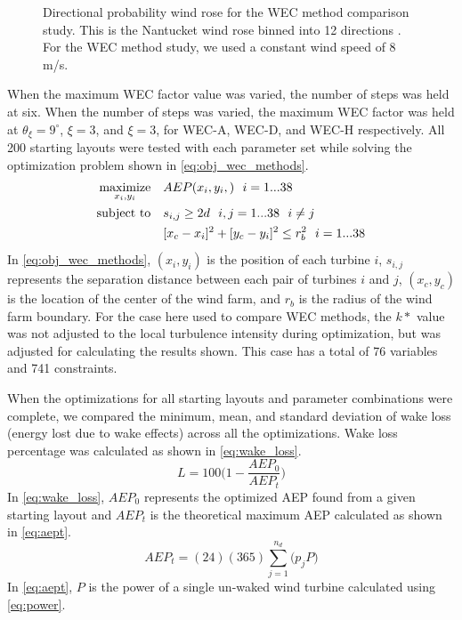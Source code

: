 \documentclass[a4paper]{jpconf}
\begin{document}
\begin{figure}[h!]
\begin{minipage}[t]{18pc}
		\caption{Directional probability wind rose for the WEC method comparison study. This is the Nantucket wind rose binned into 12 directions \cite{wrcc2017}. For the WEC method study, we used a constant wind speed of 8 m/s.}
		\label{fig:nantucket12dirs}
	\end{minipage} 
\end{figure}


When the maximum WEC factor value was varied, the number of steps was held at six. When the number of steps was varied, the maximum WEC factor was held at $\theta_\xi = 9 ^\circ$, $\xi=3$, and $\xi=3$, for WEC-A, WEC-D, and WEC-H respectively. All 200 starting layouts were tested with each parameter set while solving the optimization problem shown in \cref{eq:obj_wec_methods}. 
%
\begin{equation}
\label{eq:obj_wec_methods}
\begin{aligned} [b]
\underset{x_i,y_i}{\textrm{maximize}} \quad & AEP(x_i,y_i,)~~i=1...38\\
\textrm{subject to} \quad & s_{i,j} \geq 2\*d~~i,j=1...38~~i \neq j\\
& [x_c-x_i]^2+[y_c-y_i]^2 \leq r_{b}^2~~i=1...38
\end{aligned}
\end{equation}
%
In \cref{eq:obj_wec_methods}, $(x_i,y_i)$ is the position of each turbine $i$, $s_{i,j}$ represents the separation distance between each pair of turbines $i$ and $j$, $(x_c,y_c)$ is the location of the center of the wind farm, and $r_b$ is the radius of the wind farm boundary. For the case here used to compare WEC methods, the $k*$ value was not adjusted to the local turbulence intensity during optimization, but was adjusted for calculating the results shown. This case has a total of 76 variables and 741 constraints.

When the optimizations for all starting layouts and parameter combinations were complete, we compared the minimum, mean, and standard deviation of wake loss (energy lost due to wake effects) across all the optimizations. Wake loss percentage was calculated as shown in \cref{eq:wake_loss}.
%
\begin{equation} \label{eq:wake_loss}
	L = 100 \bigg( 1 - \frac{AEP_0}{AEP_t} \bigg)
\end{equation}
%
 In \cref{eq:wake_loss}, $AEP_0$ represents the optimized AEP found from a given starting layout and $AEP_t$ is the theoretical maximum AEP calculated as shown in \cref{eq:aept}. 
 \begin{equation} \label{eq:aept}
 AEP_t = (24)(365)\sum_{j=1}^{n_d} \bigg( p_j P \bigg)  
 \end{equation}
 In \cref{eq:aept}, $P$ is the power of a single un-waked wind turbine calculated using \cref{eq:power}. 
 
\end{document}
